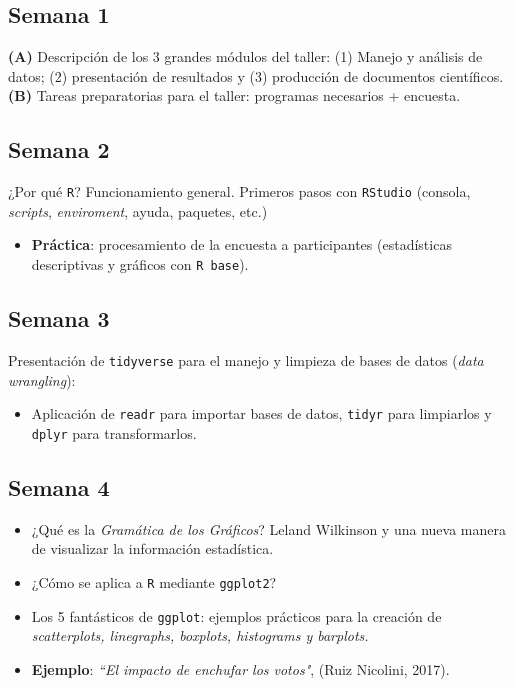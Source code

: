 \documentclass[11pt]{article}
\begin{document}
\clearpage

\subsection*{Semana 1}
        
\textbf{(A)} Descripción de los 3 grandes módulos del taller: (1) Manejo  y análisis de datos; (2) presentación de resultados y (3) producción de documentos científicos. \textbf{(B)} Tareas preparatorias para el taller: programas necesarios + encuesta. 
        
\subsection*{Semana 2}

¿Por qué \verb=R=? Funcionamiento general. Primeros pasos con \verb=RStudio= (consola, \textit{scripts}, \textit{enviroment}, ayuda, paquetes, etc.) 

    \begin{itemize}
        \item \textbf{Práctica}: procesamiento de la encuesta a participantes (estadísticas descriptivas y gráficos con  \verb=R base=).
    \end{itemize}
  
\subsection*{Semana 3}
        Presentación de \verb=tidyverse= para el manejo y limpieza de bases de datos (\textit{data wrangling}): 
        
    \begin{itemize}
            \item Aplicación de \verb=readr= para importar bases de datos, \verb=tidyr= para limpiarlos y \verb=dplyr= para transformarlos.
    \end{itemize}   
    
\subsection*{Semana 4}

    \begin{itemize}
        \item ¿Qué es la 
        \textit{Gramática de los Gráficos}?
        Leland Wilkinson y una nueva manera de visualizar la información estadística.
        
        \item ¿Cómo se aplica a \verb=R= mediante \verb=ggplot2=? 
        \item Los 5 fantásticos de \verb=ggplot=: ejemplos prácticos para la creación de \textit{scatterplots, linegraphs, boxplots, histograms y barplots.}
        \item \textbf{Ejemplo}: \textit{``El impacto de enchufar los votos"}, (Ruiz Nicolini, 2017).
    \end{itemize}
\end{document}
